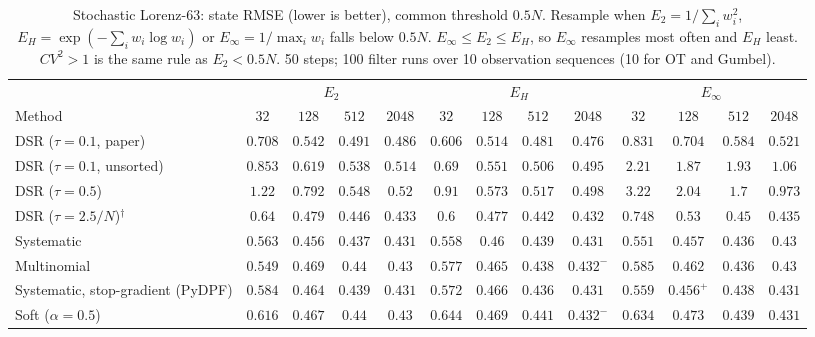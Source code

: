 \begin{table}[ht]
\centering
\small
\caption{Stochastic Lorenz-63: state RMSE (lower is better), common threshold $0.5N$. Resample when $E_2=1/\sum_iw_i^2$, $E_H=\exp(-\sum_iw_i\log w_i)$ or $E_\infty=1/\max_iw_i$ falls below $0.5N$. $E_\infty\le E_2\le E_H$, so $E_\infty$ resamples most often and $E_H$ least. $CV^2>1$ is the same rule as $E_2<0.5N$. 50 steps; 100 filter runs over 10 observation sequences (10 for OT and Gumbel).}
\label{tab:trigger-fixed-lorenz63-rmse}
\begin{adjustbox}{max width=\linewidth}
\begin{tabular}{lcccc|cccc|cccc}
\toprule
 & \multicolumn{4}{c}{$E_2$} & \multicolumn{4}{c}{$E_H$} & \multicolumn{4}{c}{$E_\infty$} \\
\cmidrule(lr){2-5} \cmidrule(lr){6-9} \cmidrule(lr){10-13}
Method & $32$ & $128$ & $512$ & $2048$ & $32$ & $128$ & $512$ & $2048$ & $32$ & $128$ & $512$ & $2048$ \\
\midrule
DSR ($\tau{=}0.1$, paper) & $0.708$ & $0.542$ & $0.491$ & $0.486$ & $\mathbf{0.606}$ & $\mathbf{0.514}$ & $\mathbf{0.481}$ & $\mathbf{0.476}$ & $0.831$ & $0.704$ & $0.584$ & $0.521$ \\
DSR ($\tau{=}0.1$, unsorted) & $0.853$ & $0.619$ & $0.538$ & $0.514$ & $\mathbf{0.69}$ & $\mathbf{0.551}$ & $\mathbf{0.506}$ & $\mathbf{0.495}$ & $2.21$ & $1.87$ & $1.93$ & $1.06$ \\
DSR ($\tau{=}0.5$) & $1.22$ & $0.792$ & $0.548$ & $0.52$ & $\mathbf{0.91}$ & $\mathbf{0.573}$ & $\mathbf{0.517}$ & $\mathbf{0.498}$ & $3.22$ & $2.04$ & $1.7$ & $0.973$ \\
DSR ($\tau{=}2.5/N$)$^\dagger$ & $0.64$ & $0.479$ & $0.446$ & $0.433$ & $\mathbf{0.6}$ & $\mathbf{0.477}$ & $\mathbf{0.442}$ & $\mathbf{0.432}$ & $0.748$ & $0.53$ & $0.45$ & $0.435$ \\
\midrule
Systematic & $0.563$ & $\mathbf{0.456}$ & $0.437$ & $0.431$ & $0.558$ & $0.46$ & $0.439$ & $0.431$ & $\mathbf{0.551}$ & $0.457$ & $\mathbf{0.436}$ & $\mathbf{0.43}$ \\
Multinomial & $\mathbf{0.549}$ & $0.469$ & $0.44$ & $0.43$ & $0.577$ & $0.465$ & $0.438$ & $0.432^{-}$ & $0.585$ & $\mathbf{0.462}$ & $\mathbf{0.436}$ & $\mathbf{0.43}$ \\
Systematic, stop-gradient (PyDPF) & $0.584$ & $0.464$ & $0.439$ & $\mathbf{0.431}$ & $0.572$ & $0.466$ & $\mathbf{0.436}$ & $0.431$ & $\mathbf{0.559}$ & $\mathbf{0.456}^{+}$ & $0.438$ & $0.431$ \\
Soft ($\alpha{=}0.5$) & $\mathbf{0.616}$ & $\mathbf{0.467}$ & $0.44$ & $\mathbf{0.43}$ & $0.644$ & $0.469$ & $0.441$ & $0.432^{-}$ & $0.634$ & $0.473$ & $\mathbf{0.439}$ & $0.431$ \\

\end{tabular}
\end{adjustbox}
\end{table}

